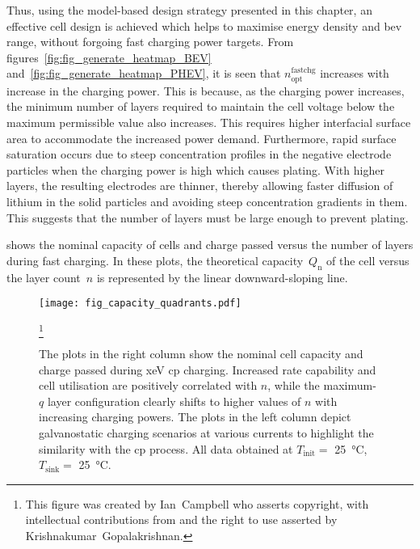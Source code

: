 Thus,   using    the   model-based    design   strategy   presented    in   this
chapter,   an   effective    cell   design   is   achieved    which   helps   to
maximise   energy   density  and   \gls{bev}   range,   without  forgoing   fast
charging   power    targets.   From   figures~\ref{fig:fig_generate_heatmap_BEV}
and~\ref{fig:fig_generate_heatmap_PHEV},       it       is       seen       that
$n^\text{fastchg}_\text{opt}$  increases with  increase in  the charging  power.
This is because,  as the charging power increases, the  minimum number of layers
required to maintain  the cell voltage below the maximum  permissible value also
increases.  This requires  higher interfacial  surface area  to accommodate  the
increased  power demand.  Furthermore, rapid  surface saturation  occurs due  to
steep  concentration  profiles in  the  negative  electrode particles  when  the
charging power is  high which causes plating. With higher  layers, the resulting
electrodes  are thinner,  thereby allowing  faster diffusion  of lithium  in the
solid  particles  and  avoiding  steep concentration  gradients  in  them.  This
suggests that the number of layers must be large enough to prevent plating.

 shows the nominal  capacity of cells and charge
passed versus  the number of  layers during fast  charging. In these  plots, the
theoretical  capacity~$Q_\text{n}$ of  the cell  versus the  layer count~$n$  is
represented by the linear downward-sloping line.

\begin{figure}[!bp]
    \begin{minipage}[t]{\textwidth}
        \centering \texttt{[image: fig\_capacity\_quadrants.pdf]}
        \captionsetup{labelsep=note}
        \caption[
        Nominal capacity and charge passed versus layer count for ---
        \emph{a}) constant current  charging and \emph{b}) constant power  charging
        ]
        {
            The plots in the right column show the nominal cell capacity and charge passed
            during \gls{xeV} \gls{cp} charging. Increased rate capability and cell utilisation are positively
            correlated with $n$, while the maximum-$q$ layer configuration clearly shifts to higher
            values of $n$ with increasing charging powers. The plots in the left column depict
            galvanostatic charging scenarios at various currents to highlight the similarity with the
            \gls{cp} process. All data obtained at $T_\text{init} =$ \SI{25}{\degreeCelsius},
            $T_\text{sink} =$ \SI{25}{\degreeCelsius}.
        }
        \label{fig:fig_CapacityQuadrants}
        \mpfootnotes[1]
        \footnote{This figure was created by \mbox{Ian Campbell} who asserts copyright,
            with intellectual contributions from and the right to use asserted by
        \mbox{Krishnakumar Gopalakrishnan}.}
    \end{minipage}
\end{figure}

